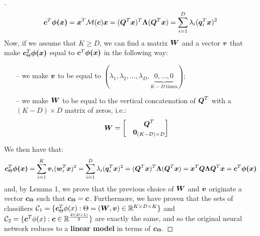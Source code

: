 \begin{questions}
\begin{proof}[\unskip\nopunct]
        \[
            \vb*{c}^T \vb*{\phi(x)} =  \vb*{x}^T \mathcal{M}(\vb*{c}) \vb*{x} = (\vb*{Q}^T \vb*{x})^T \vb*{\Lambda} (\vb*{Q}^T \vb*{x}) = \sum_{i = 1}^{D} \lambda_i (\vb*{q}_i^T\vb*{x})^2
        \]
        Now, if we assume that $K \ge D$, we can find a matrix $\vb*{W}$ and a vector $\vb*{v}$ that make $\vb*{c}^T_{\Theta} \vb*{\phi(x)}$ equal to $\vb*{c}^T \vb*{\phi(x)}$ in the following way:
        \begin{itemize}
            \item[--] we make $\vb*{v}$ to be equal to $(\lambda_1, \lambda_2, \dots, \lambda_D, \underbrace{0, \dots, 0}_{K - D \: \text{times}})$;
            \item[--] we make $\vb*{W}$ to be equal to the vertical concatenation of $\vb*{Q}^T$ with a $(K - D) \times D$ matrix of zeros, i.e.:
            \begin{align*}
            \vb*{W} = 
                \begin{bmatrix}
                    &\vb*{Q}^T \\
                    &\vb*{0}_{(K - D) \times D}
                \end{bmatrix}
            \end{align*}
        \end{itemize}
        We then have that:
        \[
            \vb*{c}^T_{\Theta} \vb*{\phi(x)} = \sum_{i = 1}^{K} \vb*{v}_i (\vb*{w}_i^T\vb*{x})^2 =  \sum_{i = 1}^{D} \lambda_i (\vb*{q}_i^T\vb*{x})^2 = (\vb*{Q}^T \vb*{x})^T \vb*{\Lambda} (\vb*{Q}^T \vb*{x}) = \vb*{x}^T \vb*{Q} \vb*{\Lambda}\vb*{Q}^T \vb*{x} = \vb*{c}^T \vb*{\phi(x)}
        \]
        and, by Lemma 1, we prove that the previous choice of $\vb*{W}$ and $\vb*{v}$ originate a vector $\vb*{c}_{\Theta}$ such that $\vb*{c}_{\Theta} = \vb*{c}$. Furthermore, we have proven that the sets of classifiers $\mathcal{C}_1 = \{\vb*{c}_{\Theta}^T\phi(x) : \Theta = (\vb*{W}, \vb*{v}) \in \mathbb{R}^{K \times D \times K}\}$ and $\mathcal{C}_2 = \{\vb*{c}^T\phi(x) : \vb*{c} \in \mathbb{R}^{\frac{D(D + 1)}{2}}\}$ are exactly the same, and so the original neural network reduces to a \textbf{linear model} in terms of $\vb*{c}_{\Theta}$.
        \end{proof}

\end{questions}
